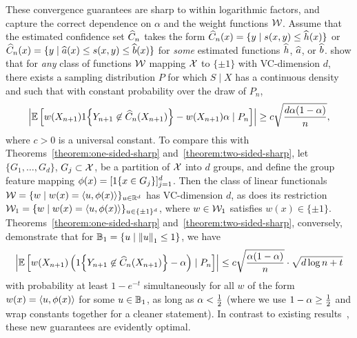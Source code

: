 \documentclass{article}
\newcommand{\radphi}{b_{\phi}}
\newcommand{\scorefunc}{s}
\newcommand{\scoreval}{\scorefunc}
\newcommand{\scorerv}{S}
\begin{document}
These convergence guarantees are sharp to within logarithmic factors,
and capture the correct dependence on $\alpha$ and the
weight functions $\mathcal{W}$.
%
Assume that the estimated confidence set $\widehat{C}_n$ takes the form
$\what{C}_n(x) = \{y \mid \scoreval(x, y) \le \what{h}(x)\}$ or
$\what{C}_n(x) = \{y \mid \what{a}(x) \le \scoreval(x, y) \le \what{b}(x)\}$
for \emph{some} estimated functions $\widehat{h}$, $\widehat{a}$, or $\widehat{b}$.
%
\citet{ArecesChDuKu24} show that for \emph{any} class of functions $\mathcal{W}$
mapping $\mathcal{X}$ to $\{\pm 1\}$ with VC-dimension $d$, there exists a
sampling distribution $P$ for which $\scorerv \mid X$ has a continuous
density and such that with constant probability over the draw of $P_n$,
\begin{equation*}
  \left|\mathbb{E}\left[w(X_{n + 1}) 1\!\left\{Y_{n + 1} \not \in \widehat{C}_n(X_{n+1})\right\}
    - w(X_{n + 1}) \alpha  \mid P_n \right]\right|
  \ge c \sqrt{\frac{d \alpha(1 - \alpha)}{n}},
\end{equation*}
where $c > 0$ is a universal constant.
%
To compare this with Theorems~\ref{theorem:one-sided-sharp}
and~\ref{theorem:two-sided-sharp}, let $\{G_1, \ldots, G_d\}$, $G_j \subset
\mathcal{X}$, be a partition of $\mathcal{X}$ into $d$ groups, and define the group
feature mapping $\phi(x) = [1\!\left\{x \in G_j\right\}]_{j = 1}^d$.
%
Then the class of linear functionals $\mathcal{W} = \{w \mid w(x) = \langle u,
\phi(x)\rangle\}_{u \in \mathbb{R}^d}$ has VC-dimension $d$, as does its restriction
$\mathcal{W}_1 = \{w \mid w(x) = \langle u, \phi(x)\rangle\}_{u \in \{\pm 1\}^d}$, where $w
\in \mathcal{W}_1$ satisfies $w(x) \in \{\pm 1\}$.
%
Theorems~\ref{theorem:one-sided-sharp} and~\ref{theorem:two-sided-sharp},
conversely, demonstrate that for
$\mathbb{B}_1 = \{u \mid \left\|{u}\right\|_1 \le 1\}$,
we have
\begin{equation*}
  \left|\mathbb{E}\left[
      w(X_{n + 1})
      \left(1\!\left\{Y_{n + 1} \not \in \widehat{C}_n(X_{n + 1})\right\}
      - \alpha\right)
      \mid P_n\right]\right|
  \le c \sqrt{\frac{\alpha(1 - \alpha) }{n}}
  \cdot \sqrt{d \log n + t}
\end{equation*}
with probability at least $1 - e^{-t}$ simultaneously for all $w$ of the
form $w(x) = \langle u, \phi(x)\rangle$ for some $u \in \mathbb{B}_1$, as long as $\alpha <
\frac{1}{2}$ (where we use $1 - \alpha \ge \frac{1}{2}$ and wrap constants together for
a cleaner statement).
%
In contrast to existing results~\cite{JungNoRaRo23, ArecesChDuKu24}, these
new guarantees are evidently optimal.


\end{document}
